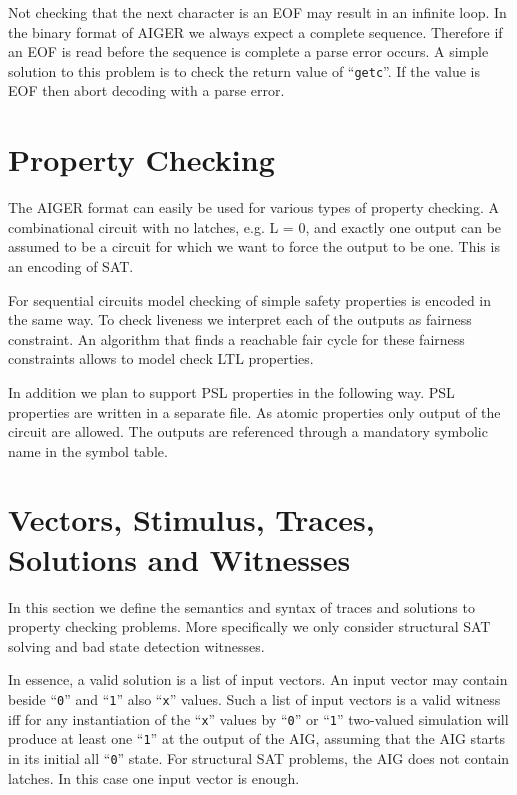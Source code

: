 \documentclass[10pt]{llncs}
\begin{document}
  Not checking that the next character is an EOF may result in an infinite
  loop.  In the binary format of AIGER we always expect a complete sequence.
  Therefore if an EOF is read before the sequence is complete a parse error
  occurs.  A simple solution to this problem is to check the return value of
  ``\texttt{getc}''.  If the value is EOF then abort decoding with a parse error.

\section{Property Checking}
  
  The AIGER format can easily be used for various types of property
  checking.  A combinational circuit with no latches, e.g. L = 0, and
  exactly one output can be assumed to be a circuit for which we want to
  force the output to be one.  This is an encoding of SAT.

  For sequential circuits model checking of simple safety properties is
  encoded in the same way.  To check liveness we interpret each of the
  outputs as fairness constraint.  An algorithm that finds a reachable fair
  cycle for these fairness constraints allows to model check LTL properties.

  In addition we plan to support PSL properties in the following way.
  PSL properties are written in a separate file.  As atomic properties
  only output of the circuit are allowed.  The outputs are referenced
  through a mandatory symbolic name in the symbol table.

\section{Vectors, Stimulus, Traces, Solutions and Witnesses}

  In this section we define the semantics and syntax of traces and solutions
  to property checking problems.  More specifically we only consider
  structural SAT solving and bad state detection witnesses.
  
  In essence, a valid solution is a list of input vectors. An input vector
  may contain beside ``\texttt{0}'' and ``\texttt{1}'' also ``\texttt{x}'' values.  Such a list of input
  vectors is a valid witness iff for any instantiation of the ``\texttt{x}'' values by
  ``\texttt{0}'' or ``\texttt{1}'' two-valued simulation will produce at least one
  ``\texttt{1}'' at the
  output of the AIG, assuming that the AIG starts in its initial all ``\texttt{0}''
  state.  For structural SAT problems, the AIG does not contain latches.
  In this case one input vector is enough.
\end{document}
